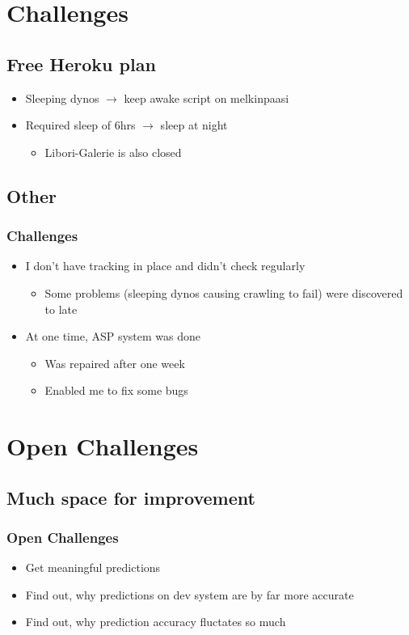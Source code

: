 \documentclass[11pt]{beamer}
\begin{document}
\section{Challenges}
\subsection{Free Heroku plan}
\begin{frame}
  \begin{itemize}
  \frametitle{Challenges}
  	\item Sleeping dynos \(\rightarrow\) keep awake script on melkinpaasi
  	\item Required sleep of 6hrs \(\rightarrow\) sleep at night
  	\begin{itemize}
  	  \item Libori-Galerie is also closed
  	\end{itemize}
  \end{itemize}
\end{frame}

\subsection{Other}
\begin{frame}
  \frametitle{Challenges}
  \begin{itemize}
  	\item I don't have tracking in place and didn't check regularly
  	\begin{itemize}
  	  \item Some problems (sleeping dynos causing crawling to fail) were discovered to late
  	\end{itemize}
  	\item At one time, ASP system was done
    \begin{itemize}
      \item Was repaired after one week
      \item Enabled me to fix some bugs
    \end{itemize}
  \end{itemize}
\end{frame}

\section{Open Challenges}
\subsection{Much space for improvement}
\begin{frame}
  \frametitle{Open Challenges}
  \begin{itemize}
  	\item Get meaningful predictions
  	\item Find out, why predictions on dev system are by far more accurate
  	\item Find out, why prediction accuracy fluctates so much
  \end{itemize}
\end{frame}
\end{document}
